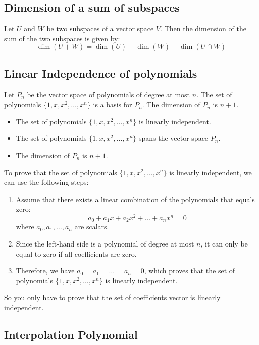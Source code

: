 \QED

\subsection{Dimension of a sum of subspaces}
Let \(U\) and \(W\) be two subspaces of a vector space \(V\). Then the dimension of the sum of the two subspaces is given by:
\[
    \dim(U + W) = \dim(U) + \dim(W) - \dim(U \cap W)    
\]

\subsection{Linear Independence of polynomials}
Let \(P_n\) be the vector space of polynomials of degree at most \(n\). The set of polynomials \(\{1, x, x^2, \ldots, x^n\}\) is a basis for \(P_n\).
The dimension of \(P_n\) is \(n + 1\).
\begin{itemize}[label=\(-\)]
    \item The set of polynomials \(\{1, x, x^2, \ldots, x^n\}\) is linearly independent.
    \item The set of polynomials \(\{1, x, x^2, \ldots, x^n\}\) spans the vector space \(P_n\).
    \item The dimension of \(P_n\) is \(n + 1\).
\end{itemize}

To prove that the set of polynomials \(\{1, x, x^2, \ldots, x^n\}\) is linearly independent, we can use the following steps:
\begin{enumerate}
    \item Assume that there exists a linear combination of the polynomials that equals zero:
    \[
        a_0 + a_1 x + a_2 x^2 + \ldots + a_n x^n = 0
    \]
    where \(a_0, a_1, \ldots, a_n\) are scalars.
    \item Since the left-hand side is a polynomial of degree at most \(n\), it can only be equal to zero if all coefficients are zero.
    \item Therefore, we have \(a_0 = a_1 = \ldots = a_n = 0\), which proves that the set of polynomials \(\{1, x, x^2, \ldots, x^n\}\) is linearly independent.
\end{enumerate}

So you only have to prove that the set of coefficients vector is linearly independent.

\subsection{Interpolation Polynomial}

